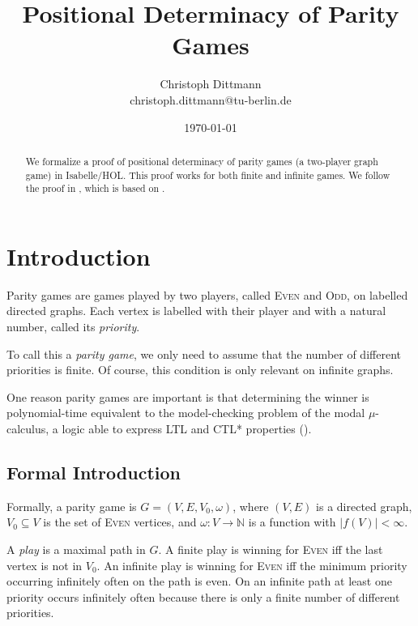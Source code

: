 \documentclass[11pt,a4paper]{scrartcl}
\newcommand{\Even}{\textsc{Even}\xspace}
\newcommand{\Odd}{\textsc{Odd}\xspace}
\begin{document}
\title{Positional Determinacy of Parity Games}
\author{Christoph Dittmann\\christoph.dittmann@tu-berlin.de}
\date{\today}
\maketitle

\begin{abstract}
  We formalize a proof of positional determinacy of parity games (a
  two-player graph game) in Isabelle/HOL.  This proof works for both
  finite and infinite games.  We follow the proof in
  \cite{kreutzer2015}, which is based on \cite{zielonka1998}.
\end{abstract}

\tableofcontents
\newpage

\section{Introduction}

Parity games are games played by two players, called \Even and \Odd,
on labelled directed graphs.  Each vertex is labelled with their
player and with a natural number, called its \emph{priority}.

To call this a \emph{parity game}, we only need to assume that the
number of different priorities is finite.  Of course, this condition
is only relevant on infinite graphs.

One reason parity games are important is that determining the winner
is polynomial-time equivalent to the model-checking problem of the
modal $\mu$-calculus, a logic able to express LTL and CTL* properties
(\cite{bradfield2007}).

\subsection{Formal Introduction}

Formally, a parity game is $G = (V,E,V_0,\omega)$, where $(V,E)$ is a
directed graph, $V_0 \subseteq V$ is the set of \Even vertices, and
$\omega: V \to \mathbb{N}$ is a function with $|f(V)| < \infty$.

A \emph{play} is a maximal path in $G$.  A finite play is winning for
\Even iff the last vertex is not in $V_0$.  An infinite play is
winning for \Even iff the minimum priority occurring infinitely often
on the path is even.  On an infinite path at least one priority occurs
infinitely often because there is only a finite number of different
priorities.
\end{document}
